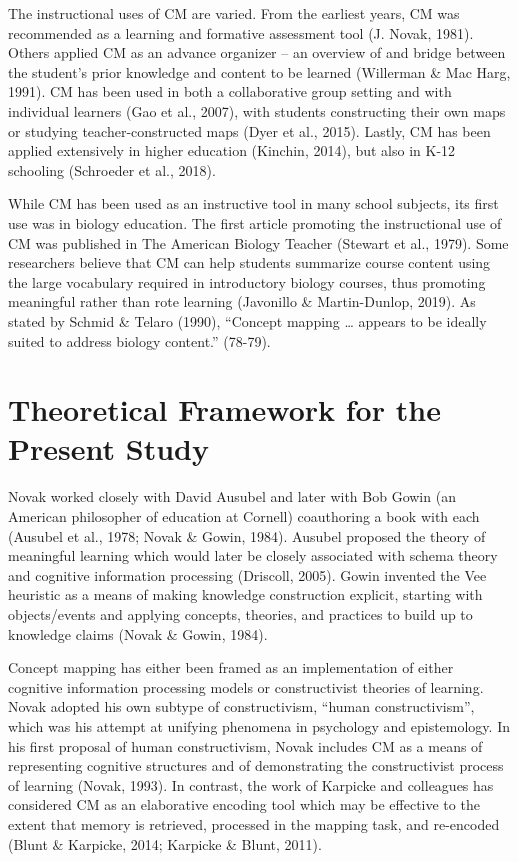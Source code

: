 \documentclass[
  letterpaper,
  DIV=11,
  numbers=noendperiod]{scrartcl}
\begin{document}
The instructional uses of CM are varied. From the earliest years, CM was
recommended as a learning and formative assessment tool (J. Novak,
1981). Others applied CM as an advance organizer -- an overview of and
bridge between the student's prior knowledge and content to be learned
(Willerman \& Mac Harg, 1991). CM has been used in both a collaborative
group setting and with individual learners (Gao et al., 2007), with
students constructing their own maps or studying teacher-constructed
maps (Dyer et al., 2015). Lastly, CM has been applied extensively in
higher education (Kinchin, 2014), but also in K-12 schooling (Schroeder
et al., 2018).

While CM has been used as an instructive tool in many school subjects,
its first use was in biology education. The first article promoting the
instructional use of CM was published in The American Biology Teacher
(Stewart et al., 1979). Some researchers believe that CM can help
students summarize course content using the large vocabulary required in
introductory biology courses, thus promoting meaningful rather than rote
learning (Javonillo \& Martin-Dunlop, 2019). As stated by Schmid \&
Telaro (1990), ``Concept mapping \ldots{} appears to be ideally suited
to address biology content.'' (78-79).

\hypertarget{theoretical-framework-for-the-present-study}{%
\section{Theoretical Framework for the Present
Study}\label{theoretical-framework-for-the-present-study}}

Novak worked closely with David Ausubel and later with Bob Gowin (an
American philosopher of education at Cornell) coauthoring a book with
each (Ausubel et al., 1978; Novak \& Gowin, 1984). Ausubel proposed the
theory of meaningful learning which would later be closely associated
with schema theory and cognitive information processing (Driscoll,
2005). Gowin invented the Vee heuristic as a means of making knowledge
construction explicit, starting with objects/events and applying
concepts, theories, and practices to build up to knowledge claims (Novak
\& Gowin, 1984).

Concept mapping has either been framed as an implementation of either
cognitive information processing models or constructivist theories of
learning. Novak adopted his own subtype of constructivism, ``human
constructivism'', which was his attempt at unifying phenomena in
psychology and epistemology. In his first proposal of human
constructivism, Novak includes CM as a means of representing cognitive
structures and of demonstrating the constructivist process of learning
(Novak, 1993). In contrast, the work of Karpicke and colleagues has
considered CM as an elaborative encoding tool which may be effective to
the extent that memory is retrieved, processed in the mapping task, and
re-encoded (Blunt \& Karpicke, 2014; Karpicke \& Blunt, 2011).
\end{document}
